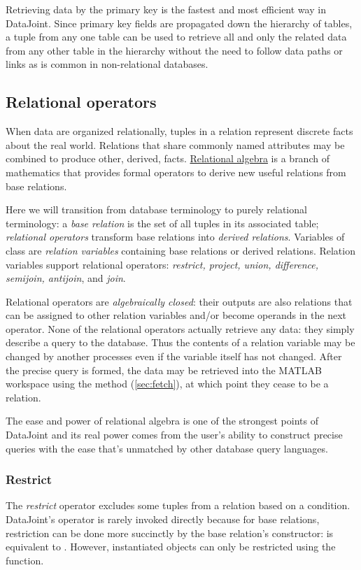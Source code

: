 \documentclass[10pt]{article}
\begin{document}
Retrieving data by the primary key is the fastest and most efficient way in DataJoint.  Since primary key fields are propagated down the hierarchy of tables, a tuple from any one table can be used to retrieve all and only the related data from any other table in the hierarchy without the need to follow data paths or links as is common in non-relational  databases.

\subsection{Relational operators}\label{sec:operators}
When data are organized relationally, tuples in a relation represent discrete facts about the real world.   Relations that share commonly named attributes may be combined to produce other, derived, facts.  \href{http://en.wikipedia.org/wiki/Relational_algebra}{Relational algebra} is a branch of mathematics that provides formal operators to derive new useful relations from base relations. 

Here we will transition from database terminology to purely relational terminology: a {\em base relation} is the set of all tuples in its associated table; {\em relational operators} transform base relations into {\em derived relations}. 
Variables of class  are {\em relation variables} containing base relations or derived relations. Relation variables support relational operators: {\em restrict, project, union, difference, semijoin, antijoin}, and {\em join}.  

Relational operators are {\em algebraically closed}: their outputs are also relations that can be assigned to other relation variables and/or become operands in the next operator. None of the relational operators actually retrieve any data: they simply describe a query to the database.  Thus the contents of a relation variable may be changed by another processes even if the variable itself has not changed.  After the precise query is formed, the data may be retrieved into the MATLAB workspace using the  method (\autoref{sec:fetch}), at which point they cease to be a relation.

The ease and power of relational algebra is one of the strongest points of DataJoint and its real power comes from the user's ability to construct precise queries with the ease that's unmatched by other database query languages.

\subsubsection{Restrict}\label{sec:restrict}
The {\em restrict} operator excludes some tuples from a relation based on a condition.  DataJoint's  operator is rarely invoked directly because for base relations, restriction can be done more succinctly by the base relation's constructor:  is equivalent to .  However, instantiated  objects can only be restricted using the  function. 
\end{document}
